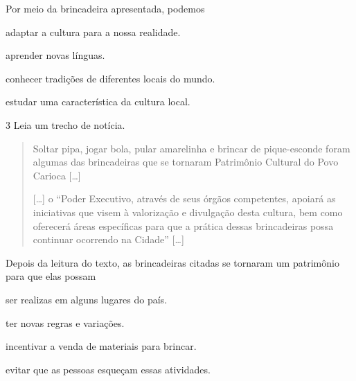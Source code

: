 \noindent{}Por meio da brincadeira apresentada, podemos

\begin{escolha}
\item adaptar a cultura para a nossa realidade.

\item aprender novas línguas.

\item conhecer tradições de diferentes locais do mundo.

\item estudar uma característica da cultura local.
\end{escolha}


\num{3} Leia um trecho de notícia.

\begin{quote}
Soltar pipa, jogar bola, pular amarelinha e brincar de pique-esconde
foram algumas das brincadeiras que se tornaram Patrimônio Cultural do
Povo Carioca {[}\ldots{}{]}

{[}\ldots{}{]} o “Poder Executivo, através de seus órgãos competentes, apoiará as iniciativas que visem à valorização e divulgação desta cultura, bem
como oferecerá áreas específicas para que a prática dessas brincadeiras
possa continuar ocorrendo na Cidade” {[}\ldots{}{]}

\end{quote}

\noindent{}Depois da leitura do texto, as brincadeiras citadas se tornaram um
patrimônio para que elas possam

\begin{escolha}
\item ser realizas em alguns lugares do país.

\item ter novas regras e variações.

\item incentivar a venda de materiais para brincar.

\item evitar que as pessoas esqueçam essas atividades.
\end{escolha}


